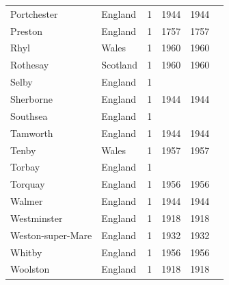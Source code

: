 \documentclass[11pt,a4paper]{article}
\begin{document}
{\begin{longtable}{llrrrl}
Portchester & England & 1 & 1944 & 1944 & \\
Preston & England & 1 & 1757 & 1757 & \\
Rhyl & Wales & 1 & 1960 & 1960 & \\
Rothesay & Scotland & 1 & 1960 & 1960 & \\
Selby & England & 1 &  &  & \\
Sherborne & England & 1 & 1944 & 1944 & \\
Southsea & England & 1 &  &  & \\
Tamworth & England & 1 & 1944 & 1944 & \\
Tenby & Wales & 1 & 1957 & 1957 & \\
Torbay & England & 1 &  &  & \\
Torquay & England & 1 & 1956 & 1956 & \\
Walmer & England & 1 & 1944 & 1944 & \\
Westminster & England & 1 & 1918 & 1918 & \\
Weston-super-Mare & England & 1 & 1932 & 1932 & \\
Whitby & England & 1 & 1956 & 1956 & \\
Woolston & England & 1 & 1918 & 1918 & \\
\bottomrule\end{longtable}}
\end{document}
